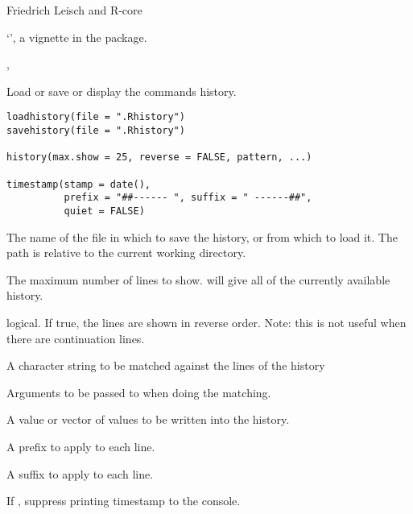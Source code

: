 %
\begin{Author}\relax
Friedrich Leisch and R-core
\end{Author}
%
\begin{SeeAlso}\relax
`', a vignette in
the  package.

, 
\end{SeeAlso}
%
\begin{Description}\relax
Load or save or display the commands history.
\end{Description}
%
\begin{Usage}
\begin{verbatim}
loadhistory(file = ".Rhistory")
savehistory(file = ".Rhistory")

history(max.show = 25, reverse = FALSE, pattern, ...)

timestamp(stamp = date(),
          prefix = "##------ ", suffix = " ------##",
          quiet = FALSE)
\end{verbatim}
\end{Usage}
%
\begin{Arguments}
\begin{ldescription}
\item[\code{file}] The name of the file in which to save the history, or
from which to load it. The path is relative to the current
working directory.
\item[\code{max.show}] The maximum number of lines to show.  will
give all of the currently available history.
\item[\code{reverse}] logical. If true, the lines are shown in reverse
order. Note: this is not useful when there are continuation lines.
\item[\code{pattern}] A character string to be matched against the lines of
the history
\item[\code{...}] Arguments to be passed to  when doing
the matching.
\item[\code{stamp}] A value or vector of values to be written into the history.
\item[\code{prefix}] A prefix to apply to each line.
\item[\code{suffix}] A suffix to apply to each line.
\item[\code{quiet}] If , suppress printing timestamp to the console.
\end{ldescription}
\end{Arguments}
